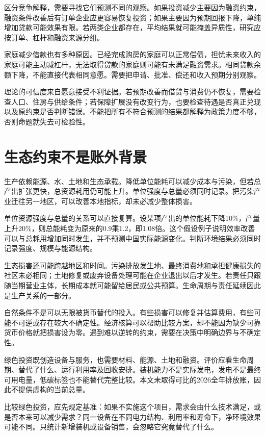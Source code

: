 \documentclass[UTF8,fontset=fandol,zihao=-4,oneside,openany]{ctexbook}
\begin{document}
\label{arg:P237}
区分竞争解释，需要寻找它们预测不同的观察。如果投资减少主要因为融资约束，融资条件改善后有订单企业应更容易恢复投资；如果主要因为预期回报下降，单纯增加贷款可能效果有限。若两类企业都存在，平均结果就可能掩盖异质性，研究应按订单、杠杆和融资来源分组。

家庭减少借款也有多种原因。已经完成购房的家庭可以正常偿债，担忧未来收入的家庭可能主动减杠杆，无法取得贷款的家庭则可能有未满足融资需求。相同贷款余额下降，不能直接代表相同意愿。需要把申请、批准、偿还和收入预期分别观察。

理论的可信度来自愿意接受不利证据。若预期改善而借贷与消费仍不恢复，需要检查人口、住房与供给条件；若保障扩展没有改变行为，也要检查待遇是否真正兑现以及原约束是否判断错误。不能把所有不符合预测的结果都解释为政策力度不够，否则命题就失去可检验性。

\section{生态约束不是账外背景}
生产依赖能源、水、土地和生态承载。降低单位能耗可以减少成本与污染，但若总产出扩张更快，总资源耗用仍可能上升。单位强度与总量必须同时记录。把污染产业迁往另一地区，可以改善本地指标，却未必减少整体损害。

\label{arg:P238}
单位资源强度与总量的关系可以直接复算。设某项产出的单位能耗下降10\%，产量上升20\%，则总能耗变为原来的0.9乘1.2，即1.08倍。这个假设例子说明效率改善可以与总耗用增加同时发生，并不预测中国实际能源变化。判断环境结果必须同时记录强度、规模与能源结构。

生态损害还可能跨越地区和时间。污染排放发生地、最终消费地和承担健康损失的社区未必相同；土地修复或废弃设备处理可能在企业退出以后才发生。若责任只跟随当期营业主体，长期成本就可能留给居民或公共预算。生命周期与责任延续因此是生产关系的一部分。

自然条件不是可以无限被货币替代的投入。有些损害可以修复并估算费用，有些可能不可逆或存在较大不确定性。经济核算可以帮助比较方案，却不能因为缺少可靠货币价格就把损害设为零。遇到难以逆转的约束，需要在决策中明确边界与不确定性。

绿色投资既创造设备与服务，也需要材料、能源、土地和融资。评价应看生命周期、替代了什么、运行利用率及回收安排。装机能力不是实际发电，发电不是最终可用电量，低碳标签也不能替代完整比较。本文未取得可比的2026全年排放账，因此不提供虚构的当前总量。

\label{arg:P239}
比较绿色投资，应先规定基准：如果不实施这个项目，需求会由什么技术满足，或是否本来可以减少需求？同一设备在不同电力结构、利用率和寿命下，净环境效果可能不同。只统计新增装机或设备销售，会忽略它究竟替代了什么。
\end{document}
